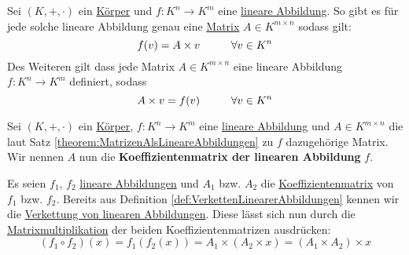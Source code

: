 \documentclass[../../main.tex]{subfiles}
\begin{document}
	\begin{theorem}
		\label{theorem:MatrizenAlsLineareAbbildungen}
		Sei $(K,+,\cdot)$ ein \hyperref[def:Körper]{Körper} und $f: K^n \rightarrow K^m$ eine \hyperref[def:LineareAbbildung]{lineare Abbildung}. So gibt es für jede solche lineare Abbildung genau eine \hyperref[def:Matrix]{Matrix} $A \in K^{m \times n}$ sodass gilt: 
		$$
		f(v) = A \times v \hspace*{1cm} \forall v \in K^n
		$$
		Des Weiteren gilt dass jede Matrix $A \in K^{m \times n}$ eine lineare Abbildung $f: K^n \rightarrow K^m$ definiert, sodass 
		$$
		A \times v = f(v) \hspace*{1cm} \forall v \in K^n
		$$
	\end{theorem}

	\begin{definition}
		\label{def:KoeffizientenmatrixEinerLinearenAbbildung}
		Sei $(K,+,\cdot)$ ein \hyperref[def:Körper]{Körper}, $f: K^n \rightarrow K^m$ eine \hyperref[def:LineareAbbildung]{lineare Abbildung} und $A \in K^{m \times n}$ die laut Satz \ref{theorem:MatrizenAlsLineareAbbildungen} zu $f$ dazugehörige Matrix. Wir nennen $A$ nun die \textbf{Koeffizientenmatrix der linearen Abbildung} $f$. 
	\end{definition}

	\begin{theorem}
		Es seien $f_1$, $f_2$ \hyperref[def:LineareAbbildung]{lineare Abbildungen} und $A_1$ bzw. $A_2$ die \hyperref[def:KoeffizientenmatrixEinerLinearenAbbildung]{Koeffizientenmatrix} von $f_1$ bzw. $f_2$. Bereits aus Definition \ref{def:VerkettenLinearerAbbildungen} kennen wir die \hyperref[def:VerkettenLinearerAbbildungen]{Verkettung von linearen Abbildungen}. Diese lässt sich nun durch die \hyperref[def:Matrixmultiplikation]{Matrixmultiplikation} der beiden Koeffizientenmatrizen ausdrücken: 
		$$
			(f_1 \circ f_2)(x) = f_1(f_2(x)) = A_1 \times (A_2 \times x) = (A_1 \times A_2) \times x
		$$
	\end{theorem}
	
\end{document}
